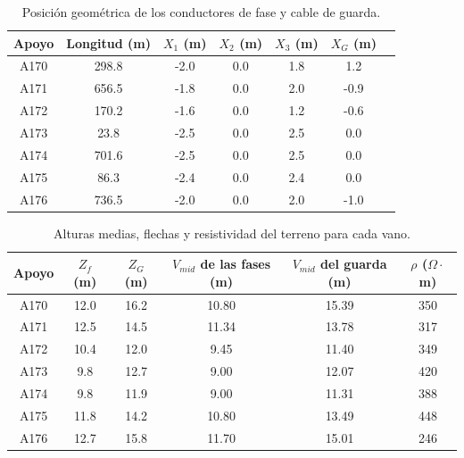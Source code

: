 \documentclass[12pt,letterpaper]{article}
\begin{document}
\begin{table}[H]
\centering
\caption{Posición geométrica de los conductores de fase y cable de guarda.}
\label{tab:geometria_posicion}
\renewcommand{\arraystretch}{1.2}
\begin{tabular}{ccccccc}
\toprule
Apoyo &
Longitud (m) &
$X_1$ (m) &
$X_2$ (m) &
$X_3$ (m) &
$X_G$ (m) \\
\midrule
A170 & 298.8 & -2.0 & 0.0 & 1.8 & 1.2 \\
A171 & 656.5 & -1.8 & 0.0 & 2.0 & -0.9 \\
A172 & 170.2 & -1.6 & 0.0 & 1.2 & -0.6 \\
A173 & 23.8  & -2.5 & 0.0 & 2.5 & 0.0 \\
A174 & 701.6 & -2.5 & 0.0 & 2.5 & 0.0 \\
A175 & 86.3  & -2.4 & 0.0 & 2.4 & 0.0 \\
A176 & 736.5 & -2.0 & 0.0 & 2.0 & -1.0 \\
\bottomrule
\end{tabular}
\end{table}
\begin{table}[H]
\centering
\caption{Alturas medias, flechas y resistividad del terreno para cada vano.}
\label{tab:geometria_alturas}
\renewcommand{\arraystretch}{1.2}
\begin{tabular}{cccccc}
\toprule
Apoyo &
$Z_f$ (m) &
$Z_G$ (m) &
$V_{mid}$ de las fases (m) &
$V_{mid}$ del guarda (m) &
$\rho$ ($\Omega\cdot$m) \\
\midrule
A170 & 12.0 & 16.2 & 10.80 & 15.39 & 350 \\
A171 & 12.5 & 14.5 & 11.34 & 13.78 & 317 \\
A172 & 10.4 & 12.0 & 9.45 & 11.40 & 349 \\
A173 & 9.8  & 12.7 & 9.00 & 12.07 & 420 \\
A174 & 9.8  & 11.9 & 9.00 & 11.31 & 388 \\
A175 & 11.8 & 14.2 & 10.80 & 13.49 & 448 \\
A176 & 12.7 & 15.8 & 11.70 & 15.01 & 246 \\
\bottomrule
\end{tabular}
\end{table}
\end{document}
